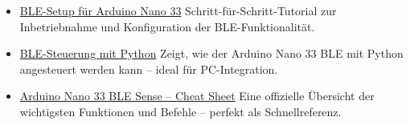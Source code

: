 \begin{itemize}
	\item \href{https://ladvien.com/arduino-nano-33-bluetooth-low-energy-setup/}{BLE-Setup für Arduino Nano 33}  
	\newline Schritt-für-Schritt-Tutorial zur Inbetriebnahme und Konfiguration der BLE-Funktionalität.
	
	\item \href{https://www.hackster.io/sridhar-rajagopal/control-arduino-nano-ble-with-bluetooth-python-331e33}{BLE-Steuerung mit Python}  
	\newline Zeigt, wie der Arduino Nano 33 BLE mit Python angesteuert werden kann – ideal für PC-Integration.
	
	\item \href{https://docs.arduino.cc/tutorials/nano-33-ble-sense/cheat-sheet}{Arduino Nano 33 BLE Sense – Cheat Sheet}  
	\newline Eine offizielle Übersicht der wichtigsten Funktionen und Befehle – perfekt als Schnellreferenz.
\end{itemize}



